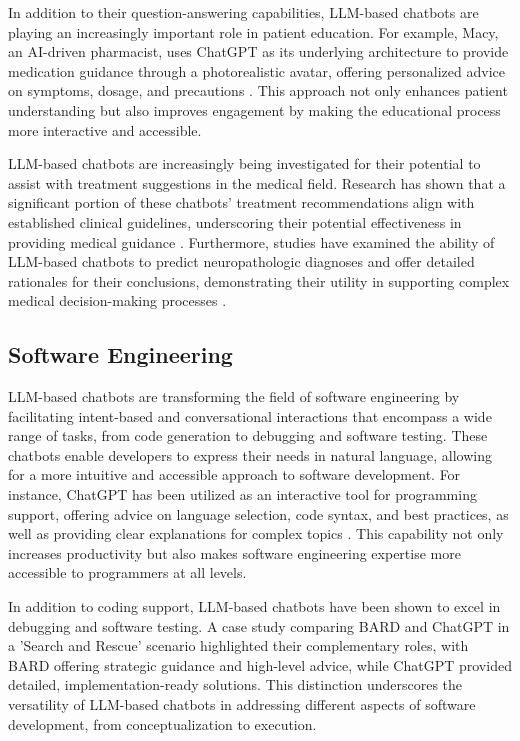 In addition to their question-answering capabilities, LLM-based chatbots are playing an increasingly important role in patient education. For example, Macy, an AI-driven pharmacist, uses ChatGPT as its underlying architecture to provide medication guidance through a photorealistic avatar, offering personalized advice on symptoms, dosage, and precautions \cite{leung2023}. This approach not only enhances patient understanding but also improves engagement by making the educational process more interactive and accessible.

LLM-based chatbots are increasingly being investigated for their potential to assist with treatment suggestions in the medical field. Research has shown that a significant portion of these chatbots’ treatment recommendations align with established clinical guidelines, underscoring their potential effectiveness in providing medical guidance \cite{chen2023use}. Furthermore, studies have examined the ability of LLM-based chatbots to predict neuropathologic diagnoses and offer detailed rationales for their conclusions, demonstrating their utility in supporting complex medical decision-making processes \cite{koga2024evaluating}.

\subsection{Software Engineering}

LLM-based chatbots are transforming the field of software engineering by facilitating intent-based and conversational interactions that encompass a wide range of tasks, from code generation to debugging and software testing. These chatbots enable developers to express their needs in natural language, allowing for a more intuitive and accessible approach to software development. For instance, ChatGPT has been utilized as an interactive tool for programming support, offering advice on language selection, code syntax, and best practices, as well as providing clear explanations for complex topics \cite{meyer2023chatgpt}. This capability not only increases productivity but also makes software engineering expertise more accessible to programmers at all levels.

In addition to coding support, LLM-based chatbots have been shown to excel in debugging and software testing. A case study comparing BARD and ChatGPT in a 'Search and Rescue' scenario highlighted their complementary roles, with BARD offering strategic guidance and high-level advice, while ChatGPT provided detailed, implementation-ready solutions. This distinction underscores the versatility of LLM-based chatbots in addressing different aspects of software development, from conceptualization to execution.

